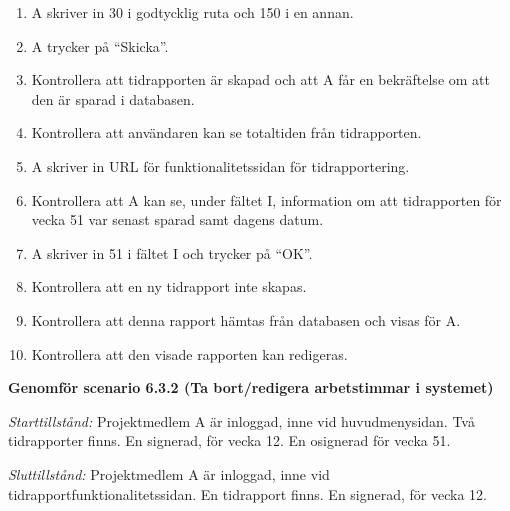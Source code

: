 \documentclass[a4paper]{article}
\begin{document}
\begin{ST}
\begin{enumerate}
\item A skriver in 30 i godtycklig ruta och 150 i en annan.
\item A trycker på ``Skicka''.
\item Kontrollera att tidrapporten är skapad och att A får en bekräftelse om att den är sparad i databasen.
\item Kontrollera att användaren kan se totaltiden från tidrapporten.
\item A skriver in URL för funktionalitetssidan för tidrapportering.
\item Kontrollera att A kan se, under fältet I, information om att tidrapporten för vecka 51 var senast sparad samt dagens datum.
\item A skriver in 51 i fältet I och trycker på ``OK''.
\item Kontrollera att en ny tidrapport inte skapas.
\item Kontrollera att denna rapport hämtas från databasen och visas för A.
\item Kontrollera att den visade rapporten kan redigeras.

\end{enumerate}

\item
\textbf{Genomför scenario 6.3.2 (Ta bort/redigera arbetstimmar i systemet)}

\emph{Starttillstånd:} Projektmedlem A är inloggad, inne vid huvudmenysidan. Två tidrapporter finns. En signerad, för vecka 12. En osignerad för vecka 51.

\emph{Sluttillstånd:} Projektmedlem A är inloggad, inne vid tidrapportfunktionalitetssidan. En tidrapport finns. En signerad, för vecka 12.


\end{ST}
\end{document}
